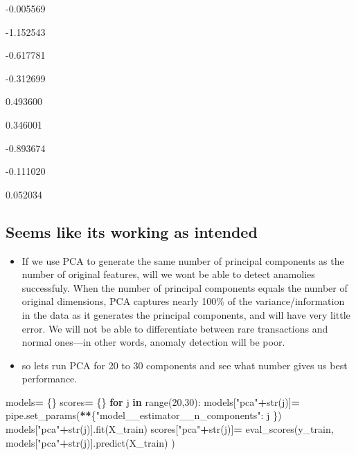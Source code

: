 \documentclass[
]{article}
\newenvironment{Shaded}{\begin{snugshade}}{\end{snugshade}}
\newcommand{\BuiltInTok}[1]{#1}
\newcommand{\ControlFlowTok}[1]{\textcolor[rgb]{0.13,0.29,0.53}{\textbf{#1}}}
\newcommand{\DecValTok}[1]{\textcolor[rgb]{0.00,0.00,0.81}{#1}}
\newcommand{\KeywordTok}[1]{\textcolor[rgb]{0.13,0.29,0.53}{\textbf{#1}}}
\newcommand{\NormalTok}[1]{#1}
\newcommand{\OperatorTok}[1]{\textcolor[rgb]{0.81,0.36,0.00}{\textbf{#1}}}
\newcommand{\StringTok}[1]{\textcolor[rgb]{0.31,0.60,0.02}{#1}}
\providecommand{\tightlist}{%
  \setlength{\itemsep}{0pt}\setlength{\parskip}{0pt}}
\begin{document}
-0.005569

-1.152543

-0.617781

-0.312699

0.493600

0.346001

-0.893674

-0.111020

0.052034

\hypertarget{seems-like-its-working-as-intended}{%
\subsection{Seems like its working as
intended}\label{seems-like-its-working-as-intended}}

\begin{itemize}
\tightlist
\item
  If we use PCA to generate the same number of principal components as
  the number of original features, will we wont be able to detect
  anamolies successfuly. When the number of principal components equals
  the number of original dimensions, PCA captures nearly 100\% of the
  variance/information in the data as it generates the principal
  components, and will have very little error. We will not be able to
  differentiate between rare transactions and normal ones---in other
  words, anomaly detection will be poor.
\item
  so lets run PCA for 20 to 30 components and see what number gives us
  best performance.
\end{itemize}

\begin{Shaded}
\begin{Highlighting}[]
\NormalTok{models}\OperatorTok{=}\NormalTok{ \{\}}
\NormalTok{scores}\OperatorTok{=}\NormalTok{ \{\}}
\ControlFlowTok{for}\NormalTok{ j }\KeywordTok{in} \BuiltInTok{range}\NormalTok{(}\DecValTok{20}\NormalTok{,}\DecValTok{30}\NormalTok{):}
\NormalTok{    models[}\StringTok{"pca"}\OperatorTok{+}\BuiltInTok{str}\NormalTok{(j)]}\OperatorTok{=}\NormalTok{ pipe.set\_params(}\OperatorTok{**}\NormalTok{\{}\StringTok{"model\_\_estimator\_\_n\_components"}\NormalTok{: j \})}
\NormalTok{    models[}\StringTok{"pca"}\OperatorTok{+}\BuiltInTok{str}\NormalTok{(j)].fit(X\_train)}
\NormalTok{    scores[}\StringTok{"pca"}\OperatorTok{+}\BuiltInTok{str}\NormalTok{(j)]}\OperatorTok{=}\NormalTok{ eval\_scores(y\_train, models[}\StringTok{"pca"}\OperatorTok{+}\BuiltInTok{str}\NormalTok{(j)].predict(X\_train) )}
\end{Highlighting}
\end{Shaded}
\end{document}
